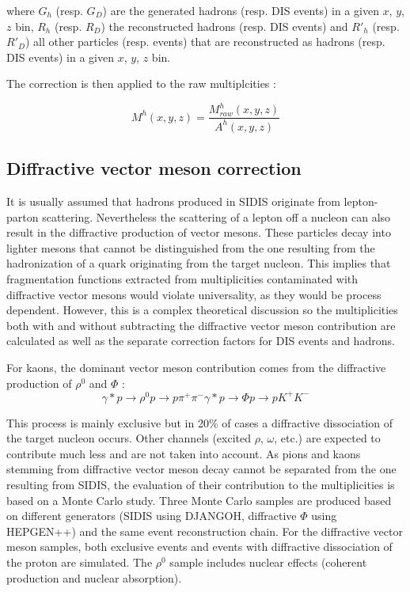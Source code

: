 \documentclass[letterpaper,12pt]{article}
\begin{document}
where $G_h$ (resp. $G_D$) are the generated hadrons (resp. DIS events) in a given $x$, $y$, $z$ bin, $R_h$ (resp. $R_D$) the reconstructed
hadrons (resp. DIS events) and $R'_h$ (resp. $R'_D$) all other particles (resp. events) that are reconstructed as hadrons (resp. DIS events)
in a given $x$, $y$, $z$ bin.

The correction is then applied to the raw multiplcities :

\begin{equation}
  M^h(x,y,z) = \frac{M^h_{raw}(x,y,z)}{A^h(x,y,z)}
\end{equation}

\subsection{Diffractive vector meson correction}

It is usually assumed that hadrons produced in SIDIS originate from lepton-parton scattering. Nevertheless the scattering of a lepton
off a nucleon can also result in the diffractive production of vector mesons. These particles decay into lighter mesons that cannot be
distinguished from the one resulting from the hadronization of a quark originating from the target nucleon. This implies that fragmentation
functions extracted from multiplicities contaminated with diffractive vector mesons would violate universality, as they would be process
dependent. However, this is a complex theoretical discussion so the multiplicities both with and without subtracting the diffractive vector
meson contribution are calculated as well as the separate correction factors for DIS events and hadrons.

For kaons, the dominant vector meson contribution comes from the diffractive production of $\rho^0$ and $\Phi$ :
\begin{equation}
    \gamma * p \rightarrow \rho^0 p \rightarrow p\pi^+\pi^-
    \gamma * p \rightarrow \Phi p \rightarrow pK^+K^-
\end{equation}

This process is mainly exclusive but in 20\% of cases a diffractive dissociation of the target nucleon occurs. Other channels (excited $\rho$, $\omega$, etc.)
are expected to contribute much less and are not taken into account. As pions and kaons stemming from diffractive
vector meson decay cannot be separated from the one resulting from SIDIS, the evaluation of their contribution to the multiplicities is based on a
Monte Carlo study. Three Monte Carlo samples are produced based on different generators (SIDIS using DJANGOH, diffractive $\Phi$ using HEPGEN++) and
the same event reconstruction chain. For the diffractive vector meson samples, both exclusive events and events with diffractive dissociation of the
proton are simulated. The $\rho^0$ sample includes nuclear effects (coherent production and nuclear absorption).
\end{document}
